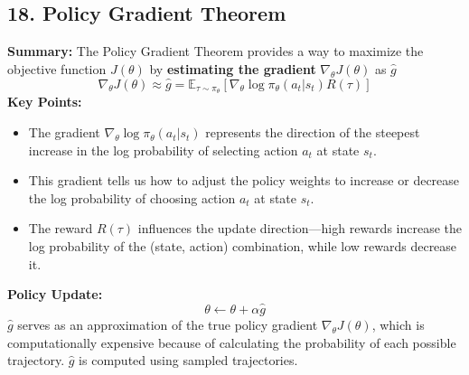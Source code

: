 \documentclass[a4paper,10pt]{article}
\begin{document}
\begin{multicols}{2}
\section*{18. Policy Gradient Theorem}
\textbf{Summary:} The Policy Gradient Theorem provides a way to maximize the objective function \( J(\theta) \) by \textbf{estimating the gradient} \( \nabla_\theta J(\theta) \) as \( \hat{g} \)
\[
\nabla_\theta J(\theta) \approx \hat{g} = \mathbb{E}_{\tau \sim \pi_\theta} \left[ \nabla_\theta \log \pi_\theta(a_t | s_t) R(\tau) \right]
\]
\textbf{Key Points:}
\begin{itemize}
    \item The gradient \( \nabla_\theta \log \pi_\theta(a_t | s_t) \) represents the direction of the steepest increase in the log probability of selecting action \( a_t \) at state \( s_t \).
    \item This gradient tells us how to adjust the policy weights to increase or decrease the log probability of choosing action \( a_t \) at state \( s_t \).
    \item The reward \( R(\tau) \) influences the update direction—high rewards increase the log probability of the (state, action) combination, while low rewards decrease it.
\end{itemize}
\textbf{Policy Update:}
\[
\theta \leftarrow \theta + \alpha \hat{g}
\]
\( \hat{g} \) serves as an approximation of the true policy gradient \( \nabla_\theta J(\theta) \), which is computationally expensive because of calculating the probability of each possible trajectory. \( \hat{g} \) is computed using sampled trajectories.

\end{multicols}
\end{document}
